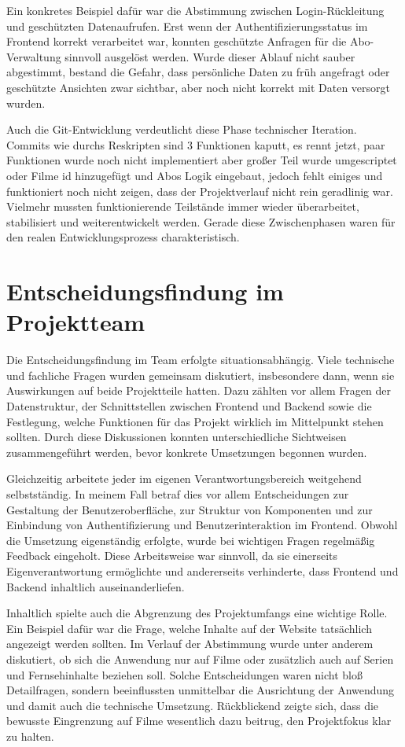 Ein konkretes Beispiel dafür war die Abstimmung zwischen Login-Rückleitung und geschützten Datenaufrufen. Erst wenn der Authentifizierungsstatus im Frontend korrekt verarbeitet war, konnten geschützte Anfragen für die Abo-Verwaltung sinnvoll ausgelöst werden. Wurde dieser Ablauf nicht sauber abgestimmt, bestand die Gefahr, dass persönliche Daten zu früh angefragt oder geschützte Ansichten zwar sichtbar, aber noch nicht korrekt mit Daten versorgt wurden.

Auch die Git-Entwicklung verdeutlicht diese Phase technischer Iteration. Commits wie \glqq durchs Reskripten sind 3 Funktionen kaputt\grqq{}, \glqq es rennt jetzt, paar Funktionen wurde noch nicht implementiert aber großer Teil wurde umgescriptet\grqq{} oder \glqq Filme id hinzugefügt und Abos Logik eingebaut, jedoch fehlt einiges und funktioniert noch nicht\grqq{} zeigen, dass der Projektverlauf nicht rein geradlinig war. Vielmehr mussten funktionierende Teilstände immer wieder überarbeitet, stabilisiert und weiterentwickelt werden. Gerade diese Zwischenphasen waren für den realen Entwicklungsprozess charakteristisch.

\section{Entscheidungsfindung im Projektteam}
Die Entscheidungsfindung im Team erfolgte situationsabhängig. Viele technische und fachliche Fragen wurden gemeinsam diskutiert, insbesondere dann, wenn sie Auswirkungen auf beide Projektteile hatten. Dazu zählten vor allem Fragen der Datenstruktur, der Schnittstellen zwischen Frontend und Backend sowie die Festlegung, welche Funktionen für das Projekt wirklich im Mittelpunkt stehen sollten. Durch diese Diskussionen konnten unterschiedliche Sichtweisen zusammengeführt werden, bevor konkrete Umsetzungen begonnen wurden.

Gleichzeitig arbeitete jeder im eigenen Verantwortungsbereich weitgehend selbstständig. In meinem Fall betraf dies vor allem Entscheidungen zur Gestaltung der Benutzeroberfläche, zur Struktur von Komponenten und zur Einbindung von Authentifizierung und Benutzerinteraktion im Frontend. Obwohl die Umsetzung eigenständig erfolgte, wurde bei wichtigen Fragen regelmäßig Feedback eingeholt. Diese Arbeitsweise war sinnvoll, da sie einerseits Eigenverantwortung ermöglichte und andererseits verhinderte, dass Frontend und Backend inhaltlich auseinanderliefen.

Inhaltlich spielte auch die Abgrenzung des Projektumfangs eine wichtige Rolle. Ein Beispiel dafür war die Frage, welche Inhalte auf der Website tatsächlich angezeigt werden sollten. Im Verlauf der Abstimmung wurde unter anderem diskutiert, ob sich die Anwendung nur auf Filme oder zusätzlich auch auf Serien und Fernsehinhalte beziehen soll. Solche Entscheidungen waren nicht bloß Detailfragen, sondern beeinflussten unmittelbar die Ausrichtung der Anwendung und damit auch die technische Umsetzung. Rückblickend zeigte sich, dass die bewusste Eingrenzung auf Filme wesentlich dazu beitrug, den Projektfokus klar zu halten.

